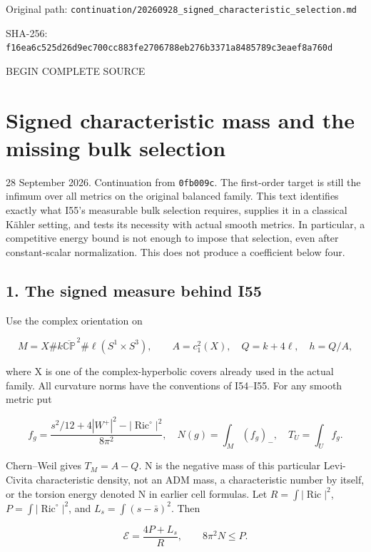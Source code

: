 \documentclass[
  10pt,
]{article}
\begin{document}
Original path:
\nolinkurl{continuation/20260928_signed_characteristic_selection.md}

SHA-256:
\nolinkurl{f16ea6c525d26d9ec700cc883fe2706788eb276b3371a8485789c3eaef8a760d}

BEGIN COMPLETE SOURCE

\hypertarget{signed-characteristic-mass-and-the-missing-bulk-selection}{%
\section{Signed characteristic mass and the missing bulk
selection}\label{signed-characteristic-mass-and-the-missing-bulk-selection}}

28 September 2026. Continuation from \texttt{0fb009c}. The first-order
target is still the infimum over all metrics on the original balanced
family. This text identifies exactly what I55's measurable bulk
selection requires, supplies it in a classical Kähler setting, and tests
its necessity with actual smooth metrics. In particular, a competitive
energy bound is not enough to impose that selection, even after
constant-scalar normalization. This does not produce a coefficient below
four.

\hypertarget{the-signed-measure-behind-i55}{%
\subsection{1. The signed measure behind
I55}\label{the-signed-measure-behind-i55}}

Use the complex orientation on

\[
 M=X\#k\overline{\mathbb{CP}}^{\,2}\#\ell(S^1\times S^3),
 \qquad A=c_1^2(X),\quad Q=k+4\ell,\quad h=Q/A,
\]

where X is one of the complex-hyperbolic covers already used in the
actual family. All curvature norms have the conventions of I54--I55. For
any smooth metric put

\[
 f_g=\frac{s^2/12+4|W^+|^2-|\operatorname{Ric}^{\circ}|^2}{8\pi^2},
 \quad N(g)=\int_M(f_g)_-,\quad T_U=\int_U f_g.
 \tag{1.1}
\]

Chern--Weil gives \(T_M=A-Q\). N is the negative mass of this particular
Levi-Civita characteristic density, not an ADM mass, a characteristic
number by itself, or the torsion energy denoted N in earlier cell
formulas. Let \(R=\int|\operatorname{Ric}|^2\),
\(P=\int|\operatorname{Ric}^{\circ}|^2\), and \(L_s=\int(s-\bar s)^2\).
Then

\[
 \mathcal E=\frac{4P+L_s}{R},\qquad 8\pi^2N\le P.
 \tag{1.2}
\]
\end{document}
